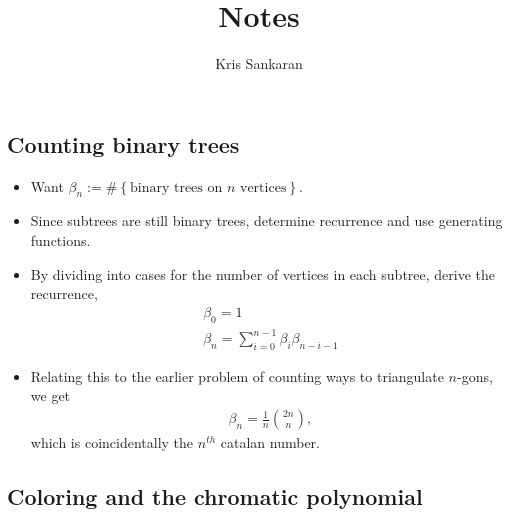 \documentclass{article}
\title{Notes}
\author{Kris Sankaran}
\begin{document}
\subsection{Counting binary trees}

\begin{itemize}
  \item Want $\beta_{n}:=\#\left\{\text{binary trees on } n \text{ vertices}\right\}$.
  \item Since subtrees are still binary trees, determine recurrence and use generating functions.
  \item By dividing into cases for the number of vertices in each subtree, derive the recurrence,
    \begin{align}
      \beta_{0} = 1 \\
      \beta_{n} = \sum_{i = 0}^{n - 1} \beta_{i}\beta_{n - i - 1}
    \end{align}
  \item Relating this to the earlier problem of counting ways to triangulate $n$-gons, we get
    \begin{align}
      \beta_{n} = \frac{1}{n}{2n \choose n},
    \end{align}
    which is coincidentally the $n^{th}$ catalan number.
\end{itemize}
    
\subsection{Coloring and the chromatic polynomial}
\end{document}
